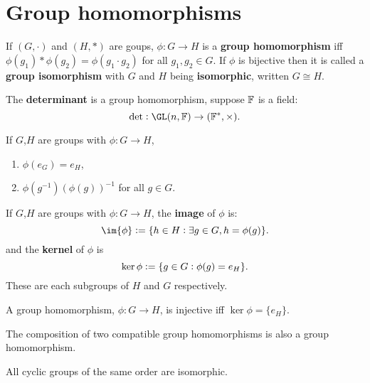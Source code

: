 \documentclass[../Year1/Year1.tex]{subfiles}
\begin{document}
\section{Group homomorphisms}

\begin{definition}
    If $(G,\cdot)$ and $(H,\ast)$ are goups, $\phi:G\rightarrow H$ is a \textbf{group homomorphism} iff $\phi(g_1)\ast\phi(g_2) = \phi(g_1\cdot g_2)$ for all $g_1,g_2\in G$. If $\phi$ is bijective then it is called a \textbf{group isomorphism} with $G$ and $H$ being \textbf{isomorphic}, written $G\cong H$.
\end{definition}

\begin{example}
    The \textbf{determinant} is a group homomorphism, suppose $\mathbb{F}$ is a field:\[
    \det: \GL(n,\FF)\rightarrow(\FF^*,\times)
    \textcolor{black}{.}
    \]
\end{example}

\begin{lemma}
    If $G$,$H$ are groups with $\phi:G\rightarrow H$, \begin{enumerate}
        \item $\phi(e_G) = e_H$,
        \item $\phi(g^{-1}) (\phi(g))^{-1}$ for all $g\in G$.
    \end{enumerate}
\end{lemma}

\begin{definition}
    If $G$,$H$ are groups with $\phi:G\rightarrow H$, the \textbf{image} of $\phi$ is: \[
        \im{\phi} := \{h\in H:\exists g\in G, h = \phi(g)\}
    \textcolor{black}{.}
    \] and the \textbf{kernel} of $\phi$ is \[
        \ker{\phi} := \{g\in G: \phi(g)=e_H\}
    \textcolor{black}{.}
    \]
    These are each subgroups of $H$ and $G$ respectively.
\end{definition}

\begin{lemma}
    A group homomorphism, $\phi:G\rightarrow H$, is injective iff $\ker\phi=\{e_H\}$.
\end{lemma}

\begin{theorem}
    The composition of two compatible group homomorphisms is also a group homomorphism.
\end{theorem}

\begin{theorem}
    All cyclic groups of the same order are isomorphic.
\end{theorem}
\end{document}
